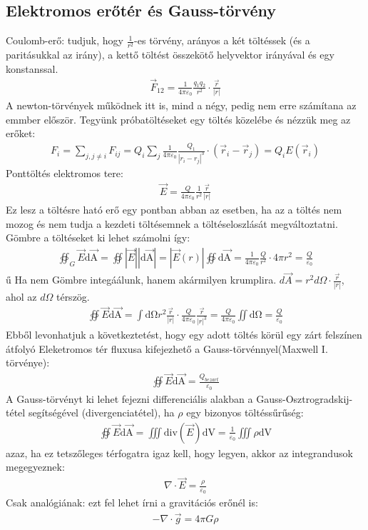 \documentclass{article}
\begin{document}
\subsection{Elektromos erőtér és Gauss-törvény}
Coulomb-erő: tudjuk, hogy $\frac{1}{r^2}$-es törvény, arányos a két töltéssek (és a paritásukkal az irány), a kettő töltést összekötő helyvektor irányával és egy konstanssal.
\begin{gather*}
\vec{F}_{12} = \frac{1}{4 \pi \varepsilon_0} \frac{q_1 q_2}{r^2} \cdot \frac{\vec{r}}{|r|}
\end{gather*}
A newton-törvények működnek itt is, mind a négy, pedig nem erre számítana az emmber először. Tegyünk próbatöltéseket egy töltés közelébe és nézzük meg az erőket:
\begin{gather*}
F_i =  \sum_{j, j\neq i} F_{ij} = Q_i \sum_j \frac{1}{4\pi \varepsilon_0} \frac{Q_1}{|r_i-r_j|^3} \cdot (\vec{r}_i-\vec{r}_j) = Q_i E(\vec{r}_i)
\end{gather*}
Ponttöltés elektromos tere:
\begin{gather*}
\vec{E}= \frac{Q}{4\pi\varepsilon_0} \frac{1}{r^2} \frac{\vec{r}}{|r|}
\end{gather*}
Ez lesz a töltésre ható erő egy pontban abban az esetben, ha az a töltés nem mozog és nem tudja a kezdeti töltésemnek a töltéseloszlását megváltoztatni.
Gömbre a töltéseket ki lehet számolni így:
\begin{gather*}
\oiint_{G} \vec{E} \mathrm{d\vec{A}} = \oiint |\vec{E}|\mathrm{|d\vec{A}|} = |\vec{E}(r)| \oiint \mathrm{d\vec{A}} = \frac{1}{4\pi \varepsilon_0} \frac{Q}{r^2} \cdot 4\pi r^2 = \frac{Q}{\varepsilon_0}
\end{gather*}ű
Ha nem Gömbre integáálunk, hanem akármilyen krumplira. $d\vec{A} = r^2 d\Omega \cdot \frac{\vec{r}}{|r|}$, ahol az $d\Omega$ térszög.
\begin{gather*}
\oiint \vec{E} \mathrm{d\vec{A}} = \int \mathrm{d\Omega} r^2 \frac{\vec{r}}{|r|} \cdot \frac{Q}{4\pi \varepsilon_0} \frac{\vec{r}}{|r|^3} = \frac{Q}{4\pi \varepsilon_0} \iint \mathrm{d\Omega} = \frac{Q}{\varepsilon_0}
\end{gather*}
Ebből levonhatjuk a következtetést, hogy egy adott töltés körül egy zárt felszínen átfolyó Eleketromos tér fluxusa kifejezhető a Gauss-törvénnyel(Maxwell I. törvénye):
\begin{gather*}
\oiint \vec{E} \mathrm{d\vec{A}} = \frac{Q_{bezart}}{\varepsilon_0}
\end{gather*}
A Gauss-törvényt ki lehet fejezni differenciális alakban a Gauss-Osztrogradskij-tétel segítségével (divergenciatétel), ha $\rho$ egy bizonyos töltéssűrűség:
\begin{gather*}
\oiint \vec{E} \mathrm{d\vec{A}} = \iiint \mathrm{div}( \vec{E}) \mathrm{dV} = \frac{1}{\varepsilon_0} \iiint \rho \mathrm{dV}
\end{gather*}
azaz, ha ez tetszőleges térfogatra igaz kell, hogy legyen, akkor az integrandusok megegyeznek:
\begin{gather*}
\boxed{\nabla \cdot \vec{E} = \frac{\rho}{\varepsilon_0}}
\end{gather*}
Csak analógiának: ezt fel lehet írni a gravitációs erőnél is: 
\begin{gather*}
-\nabla \cdot \vec{g} = 4\pi G \rho
\end{gather*}
\end{document}
